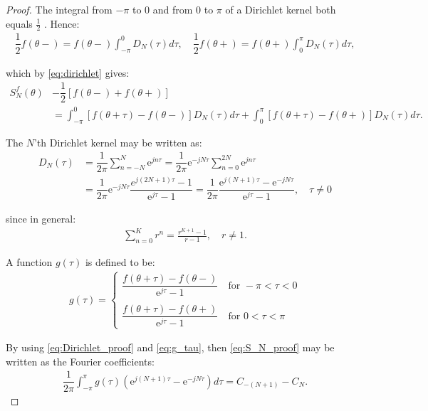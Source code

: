\begin{proof}
The integral from $-\pi$ to $0$ and from $0$ to $\pi$ of a Dirichlet kernel both equals $\frac{1}{2}$ \cite{page 35, FAA}. Hence:
	\begin{align*}
		\dfrac{1}{2} f(\theta-) = f(\theta-) \int_{-\pi}^0 				D_N(\tau)d\tau, \quad \dfrac{1}{2}f(\theta+) = 					f(\theta+) \int_0^\pi D_N (\tau)d\tau,
	\end{align*}
	
	which by \eqref{eq:dirichlet} gives:
	\begin{align} \label{eq:S_N_proof}
		S_N^f(\theta) &- \dfrac{1}{2}\left[f(\theta-) + 				f(\theta+)\right] \nonumber \\
		&= \int_{-\pi}^0 \left[f(\theta + \tau) - f(\theta-) 			\right] D_N(\tau) d\tau + \int_0^\pi \left[f(\theta + 			\tau) - f(\theta+) \right] D_N(\tau) d\tau.
	\end{align}
	
	The $N$'th Dirichlet kernel may be written as:
	\begin{align} \label{eq:Dirichlet_proof}
		D_N(\tau) &= \dfrac{1}{2\pi}\sum_{n=-N}^{N}\text{e}^{j 			n \tau} = \dfrac{1}{2\pi} \text{e}^{-jN\tau} \sum_{n=0}			^{2N} \text{e}^{jn \tau} \nonumber \\
		&= \dfrac{1}{2\pi} \text{e}^{-jN\tau} \dfrac{e^{j(2N+1)			\tau}-1}{\text{e}^{j\tau}-1} = \dfrac{1}{2\pi} 					\dfrac{\text{e}^{j(N+1)\tau}-\text{e}^{-jN\tau}}				{\text{e}^{j\tau}-1}, \quad \tau \neq 0
	\end{align}
	
	since in general:
	\begin{align*}
		\sum_{n=0}^K r^n = \frac{r^{K+1}-1}{r-1}, \quad r \neq 			1.
	\end{align*}
	
	A function $g(\tau)$ is defined to be:
	\begin{align} \label{eq:g_tau}
		g(\tau) =
		\begin{cases}
			\dfrac{f(\theta + \tau) - f(\theta-)}{\text{e}^{j				\tau}-1} \quad \text{for } -\pi < \tau < 0 \\ \\
			\dfrac{f(\theta + \tau) - f(\theta+)}{\text{e}^{j				\tau}-1} \quad \text{for } 0 < \tau < \pi
		\end{cases}
	\end{align}	
	
	By using \eqref{eq:Dirichlet_proof} and \eqref{eq:g_tau}, 		then \eqref{eq:S_N_proof} may be written as the Fourier 		coefficients:
	\begin{align} \label{eq:5.1.1_final}
		\dfrac{1}{2\pi} \int_{-\pi}^\pi g(\tau) \left(\text{e}			^{j(N+1)\tau} - \text{e}^{-jN\tau}\right) d\tau = C_{-			(N+1)} - C_N.
	\end{align}
	

\end{proof}
